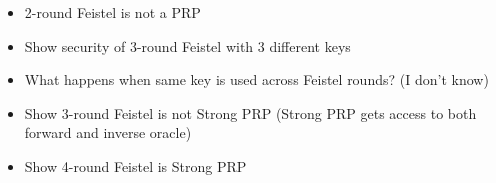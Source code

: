 \begin{itemize}
  \item 2-round Feistel is not a PRP
  \item Show security of 3-round Feistel with 3 different keys
  \item What happens when same key is used across Feistel rounds? (I don't know)
  \item Show 3-round Feistel is not Strong PRP (Strong PRP gets access to both forward and inverse oracle)
  \item Show 4-round Feistel is Strong PRP
\end{itemize}
